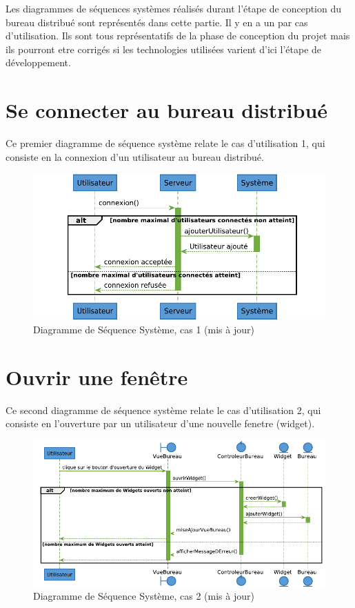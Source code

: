 Les diagrammes de séquences systèmes réalisés durant l'étape
de conception du bureau distribué sont représentés dans cette 
partie. Il y en a un par cas d'utilisation. 
Ils sont tous représentatifs de la phase de conception du projet
mais ils pourront etre corrigés si les technologies utilisées
varient d'ici l'étape de développement.

\section{Se connecter au bureau distribué}

Ce premier diagramme de séquence système relate le cas d'utilisation
1, qui consiste en la connexion d'un utilisateur au bureau distribué.

\begin{figure}[h!]
	\centering
	\includegraphics[scale=0.8]{diagrammes/dss1.pdf}
	\caption{\color{green}Diagramme de Séquence Système, cas 1 (mis à jour)\color{black}}
\end{figure}

\section{Ouvrir une fenêtre}

Ce second diagramme de séquence système relate le cas d'utilisation
2, qui consiste en l'ouverture par un utilisateur d'une nouvelle 
fenetre (widget).

\begin{figure}[h!]
	\centering
	\includegraphics[angle=90, scale = 1.2]{diagrammes/dss2.pdf}
	\caption{\color{green}Diagramme de Séquence Système, cas 2 (mis à jour)\color{black}}
\end{figure}
\newpage

